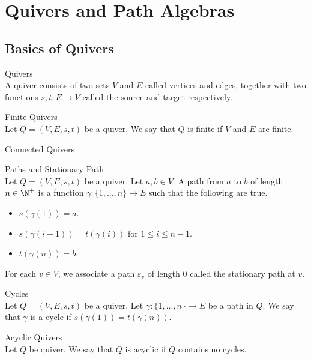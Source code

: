 \documentclass[a4paper]{article}
\begin{document}
\pagebreak
\section{Quivers and Path Algebras}
\subsection{Basics of Quivers}
\begin{defn}{Quivers}{}\\
A quiver consists of two sets $V$ and $E$ called vertices and edges, together with two functions $s,t:E\to V$ called the source and target respectively. 
\end{defn}

\begin{defn}{Finite Quivers}{}\\
Let $Q=(V,E,s,t)$ be a quiver. We say that $Q$ is finite if $V$ and $E$ are finite. 
\end{defn}

\begin{defn}{Connected Quivers}{}\\
\end{defn}

\begin{defn}{Paths and Stationary Path}{}\\
Let $Q=(V,E,s,t)$ be a quiver. Let $a,b\in V$. A path from $a$ to $b$ of length $n\in\N^+$ is a function $\gamma:\{1,\dots,n\}\to E$ such that the following are true. 
\begin{itemize}
\item $s(\gamma(1))=a$. 
\item $s(\gamma(i+1))=t(\gamma(i))$ for $1\leq i\leq n-1$. 
\item $t(\gamma(n))=b$. 
\end{itemize}
For each $v\in V$, we associate a path $\varepsilon_v$ of length $0$ called the stationary path at $v$. 
\end{defn}

\begin{defn}{Cycles}{}\\
Let $Q=(V,E,s,t)$ be a quiver. Let $\gamma:\{1,\dots,n\}\to E$ be a path in $Q$. We say that $\gamma$ is a cycle if $s(\gamma(1))=t(\gamma(n))$. 
\end{defn}

\begin{defn}{Acyclic Quivers}{}\\
Let $Q$ be quiver. We say that $Q$ is acyclic if $Q$ contains no cycles. 
\end{defn}
\end{document}

